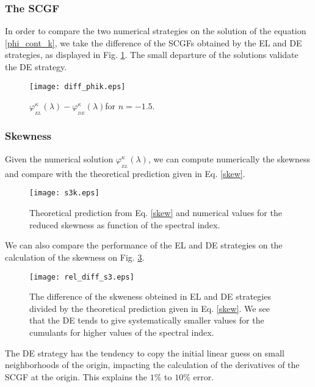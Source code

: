 \documentclass[twocolumn,aps,reprint, nofootinbib]{revtex4}
\newcommand{\varphik}{\varphi^{\kappa}}
\begin{document}
\subsubsection{The SCGF}

In order to compare the two numerical strategies on the solution of the equation \eqref{phi_cont_k}, we take the difference of the SCGFs obtained by the EL and DE strategies, as displayed in Fig. \ref{diff_phik}. The small departure of the solutions validate the DE strategy.

\begin{figure}[!ht]
\centering
\texttt{[image: diff\_phik.eps]}
\caption{$\varphik_{_{EL}}(\lambda) - \varphik_{_{DE}}(\lambda) $for $n=-1.5$.}
\label{diff_phik}
\end{figure}

\subsubsection{Skewness}

Given the numerical solution $\varphik_{_{EL}}(\lambda)$, we can compute numerically the skewness and compare with the theoretical prediction given in Eq. \eqref{skew}.

\begin{figure}[!ht]
\centering
\texttt{[image: s3k.eps]}
\caption{Theoretical prediction from Eq. \eqref{skew} and numerical values for the reduced skewness as function of the spectral index.}
\label{cumumalntsEL}
\end{figure}

We can also compare the performance of the EL and DE strategies on the calculation of the skewness on Fig. \ref{rel_diff_s3}.

\begin{figure}[!ht]
\centering
\texttt{[image: rel\_diff\_s3.eps]}
\caption{The difference of the skweness obteined in EL and DE strategies divided by the theoretical prediction given in Eq. \eqref{skew}. We see that the DE tends to give systematically smaller values for the cumulants for higher values of the spectral index.}
\label{rel_diff_s3}
\end{figure}
The DE strategy has the tendency to copy the initial linear guess on small neighborhoods of the origin, impacting the calculation of the derivatives of the SCGF at the origin. This explains the $1\%$ to $10\%$ error.
\end{document}
